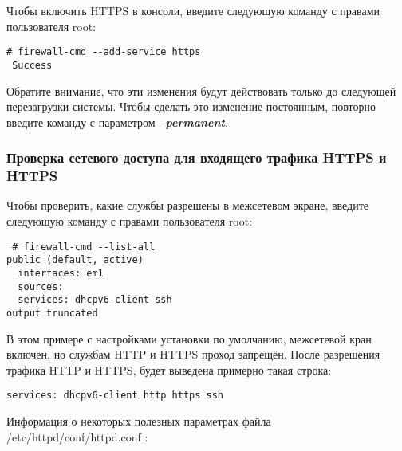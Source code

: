 \documentclass[a4paper,10pt,twoside]{article}
\begin{document}
Чтобы включить HTTPS в консоли, введите следующую команду с правами пользователя root:

\begin{verbatim}
# firewall-cmd --add-service https
 Success
\end{verbatim} 

Обратите внимание, что эти изменения будут действовать только до следующей перезагрузки системы. Чтобы сделать это изменение постоянным, повторно введите команду с параметром \textit{\textbf{--permanent}}. 


\subsubsection{Проверка сетевого доступа для входящего трафика HTTPS и HTTPS}
Чтобы проверить, какие службы разрешены в межсетевом экране, введите следующую команду с правами пользователя root: 
\begin{verbatim}
 # firewall-cmd --list-all
public (default, active)
  interfaces: em1
  sources: 
  services: dhcpv6-client ssh
output truncated
\end{verbatim} 

В этом примере с настройками установки по умолчанию, межсетевой кран включен, но службам HTTP и HTTPS проход запрещён. После разрешения трафика HTTP и HTTPS, будет выведена примерно такая строка:
\begin{verbatim}
services: dhcpv6-client http https ssh
\end{verbatim} 


Информация о некоторых полезных параметрах файла /etc/httpd/conf/httpd.conf :
\end{document}
